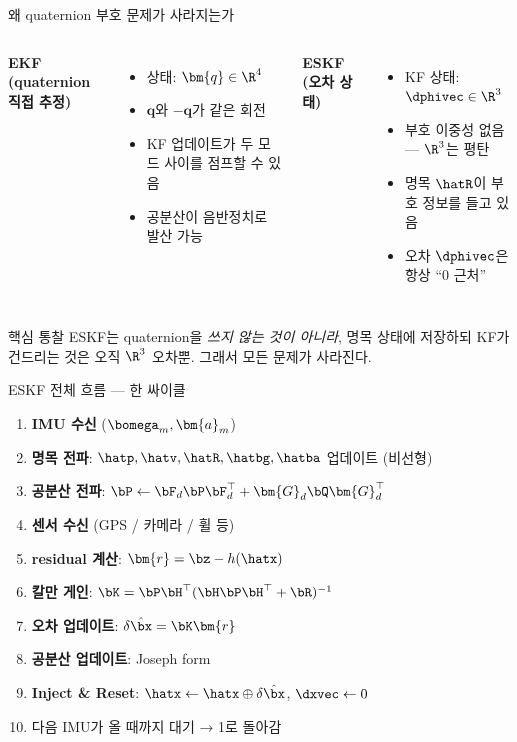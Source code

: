 \begin{frame}{왜 quaternion 부호 문제가 사라지는가}
  \begin{columns}
    \textbf{EKF (quaternion 직접 추정)}
    \begin{itemize}
      \item 상태: $\bm{q} \in \R^4$
      \item $\bm{q}$와 $-\bm{q}$가 같은 회전
      \item KF 업데이트가 두 모드 사이를 점프할 수 있음
      \item 공분산이 음반정치로 발산 가능
    \end{itemize}

    \textbf{ESKF (오차 상태)}
    \begin{itemize}
      \item KF 상태: $\dphivec \in \R^3$
      \item 부호 이중성 없음 — $\R^3$는 평탄
      \item 명목 $\hatR$이 부호 정보를 들고 있음
      \item 오차 $\dphivec$은 항상 ``0 근처''
    \end{itemize}
  \end{columns}
  \pause
  \vspace{0.4em}
  \begin{block}{핵심 통찰}
    ESKF는 quaternion을 \emph{쓰지 않는 것이 아니라}, 명목 상태에 저장하되
    KF가 건드리는 것은 오직 $\R^3$ 오차뿐. 그래서 모든 문제가 사라진다.
  \end{block}
\end{frame}

\begin{frame}{ESKF 전체 흐름 — 한 싸이클}
  \begin{enumerate}
    \item \textbf{IMU 수신} ($\bomega_m, \bm{a}_m$)
    \item \textbf{명목 전파}: $\hatp, \hatv, \hatR, \hatbg, \hatba$ 업데이트 (비선형)
    \item \textbf{공분산 전파}: $\bP \leftarrow \bF_d\bP\bF_d^\top + \bm{G}_d\bQ\bm{G}_d^\top$
    \item \textbf{센서 수신} (GPS / 카메라 / 휠 등)
    \item \textbf{residual 계산}: $\bm{r} = \bz - h(\hatx)$
    \item \textbf{칼만 게인}: $\bK = \bP\bH^\top(\bH\bP\bH^\top+\bR)^{-1}$
    \item \textbf{오차 업데이트}: $\delta\hat\bx = \bK\bm{r}$
    \item \textbf{공분산 업데이트}: Joseph form
    \item \textbf{Inject \& Reset}: $\hatx \leftarrow \hatx \oplus \delta\hat\bx$, $\dxvec \leftarrow 0$
    \item 다음 IMU가 올 때까지 대기 → 1로 돌아감
  \end{enumerate}
\end{frame}

